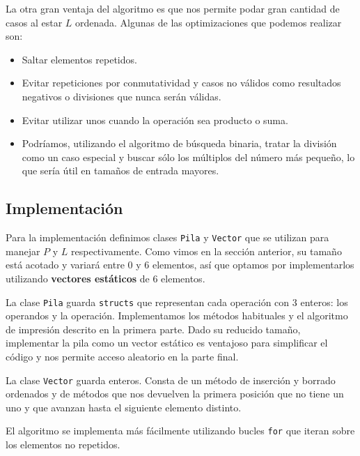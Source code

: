 La otra gran ventaja del algoritmo es que nos permite podar gran
cantidad de casos al estar $L$ ordenada. Algunas de las optimizaciones
que podemos realizar son:

\begin{itemize}
	\item Saltar elementos repetidos.
	\item Evitar repeticiones por conmutatividad y casos no válidos
	como resultados negativos o divisiones que nunca serán válidas.
	\item Evitar utilizar unos cuando la operación sea producto o suma.
	\item Podríamos, utilizando el algoritmo de búsqueda binaria,
	tratar la división como un caso especial y buscar sólo los múltiplos
	del número más pequeño, lo que sería útil en tamaños de entrada mayores.
\end{itemize}

\subsection{Implementación}

Para la implementación definimos clases \texttt{Pila} y \texttt{Vector} que
se utilizan para manejar $P$ y $L$ respectivamente. Como vimos en la sección
anterior, su tamaño está acotado y variará entre 0 y 6 elementos, así que
optamos por implementarlos utilizando \textbf{vectores estáticos} de 6 elementos.

La clase \texttt{Pila} guarda \texttt{structs} que representan cada operación
con 3 enteros: los operandos y la operación. Implementamos los métodos habituales
y el algoritmo de impresión descrito en la primera parte. Dado su reducido tamaño,
implementar la pila como un vector estático es ventajoso para simplificar el código
y nos permite acceso aleatorio en la parte final.

La clase \texttt{Vector} guarda enteros. Consta de un método de inserción y borrado
ordenados y de métodos que nos devuelven la primera posición que no tiene un uno
y que avanzan hasta el siguiente elemento distinto.

El algoritmo se implementa más fácilmente utilizando bucles \texttt{for} que iteran
sobre los elementos no repetidos.
